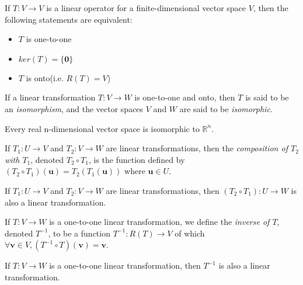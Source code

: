 \documentclass{report}
\begin{document}
		\begin{thm}
			If $T:V \rightarrow V$ is a linear operator for a finite-dimensional vector space $V$, then the following statements are equivalent:
			\begin{itemize}
				\item $T$ is one-to-one
				\item $ker(T)=\{\bm{0}\}$
				\item $T$ is onto(i.e. $R(T)=V$)
			\end{itemize}
		\end{thm}
		
		\begin{defn}[Isomorphism]
			If a linear transformation $T:V \rightarrow W$ is one-to-one and onto, then $T$ is said to be an \emph{isomorphism}, and the vector spaces $V$ and $W$ are said to be \emph{isomorphic}.
		\end{defn}
		
		\begin{thm}\label{vector_space_euclidean_space}
			Every real n-dimensional vector space is isomorphic to $\mathbb{R}^n$.
		\end{thm}
		
		\begin{defn}[Composition]
			If $T_1:U \rightarrow V$ and $T_2:V \rightarrow W$ are linear transformations, then the \emph{composition of $T_2$ with $T_1$}, denoted $T_2 \circ T_1$, is the function defined by $(T_2 \circ T_1)(\bm{u})=T_2(T_1(\bm{u}))$ where $\bm{u} \in U$.
		\end{defn}
		
		\begin{thm}
			If $T_1:U \rightarrow V$ and $T_2:V \rightarrow W$ are linear transformations, then $(T_2 \circ T_1):U \rightarrow W$ is also a linear transformation.
		\end{thm}
		
		\begin{defn}[Inverse]
			If $T:V \rightarrow W$ is a one-to-one linear transformation, we define the \emph{inverse of $T$}, denoted $T^{-1}$, to be a function $T^{-1}:R(T) \rightarrow V$ of which $\forall \bm{v} \in V, (T^{-1} \circ T)(\bm{v})=\bm{v}$.
		\end{defn}
		
		\begin{thm}
			If $T:V \rightarrow W$ is a one-to-one linear transformation, then $T^{-1}$ is also a linear transformation.
		\end{thm}
		
\end{document}
